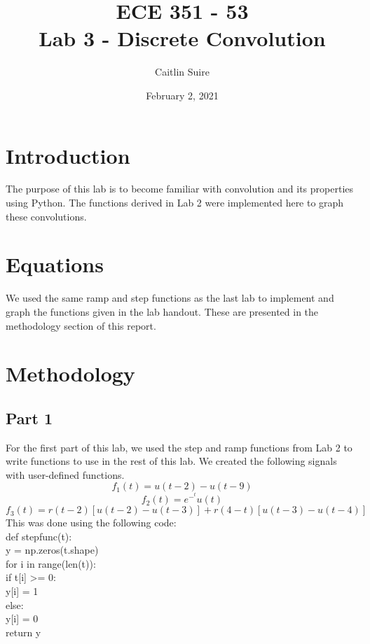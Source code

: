 \documentclass[12pt]{report}
\title{\myfont \textbf{ ECE 351 - 53 \\ \bigskip Lab 3 - Discrete Convolution}}
\author{Caitlin Suire}
\date{February 2, 2021}
\begin{document}
\maketitle

\thispagestyle{empty}

\newpage

\tableofcontents
\pagebreak


\section{Introduction}
The purpose of this lab is to become familiar with convolution and its properties using Python. The functions derived in Lab 2 were implemented here to graph these convolutions. 

\section{Equations}
We used the same ramp and step functions as the last lab to implement and graph the functions given in the lab handout. These are presented in the methodology section of this report. 

\section{Methodology}
\subsection{Part 1}
For the first part of this lab, we used the step and ramp functions from Lab 2 to write functions to use in the rest of this lab.  We created the following signals with user-defined functions. \[f_1(t) = u(t-2) - u(t-9)\] \[f_2(t) = e^-^t u(t)\] \[f_3(t) = r(t-2)[u(t-2)-u(t-3)] + r(4-t)[u(t-3) - u(t-4)]\]
This was done using the following code:\\

\indent def stepfunc(t):\\
\indent\indent    y = np.zeros(t.shape)\\
    
\indent\indent    for i in range(len(t)):\\
\indent\indent\indent        if t[i] >= 0:\\
\indent\indent\indent\indent            y[i] = 1\\
\indent\indent\indent        else:\\
\indent\indent\indent\indent            y[i] = 0\\
\indent\indent    return y\\
    
\end{document}
